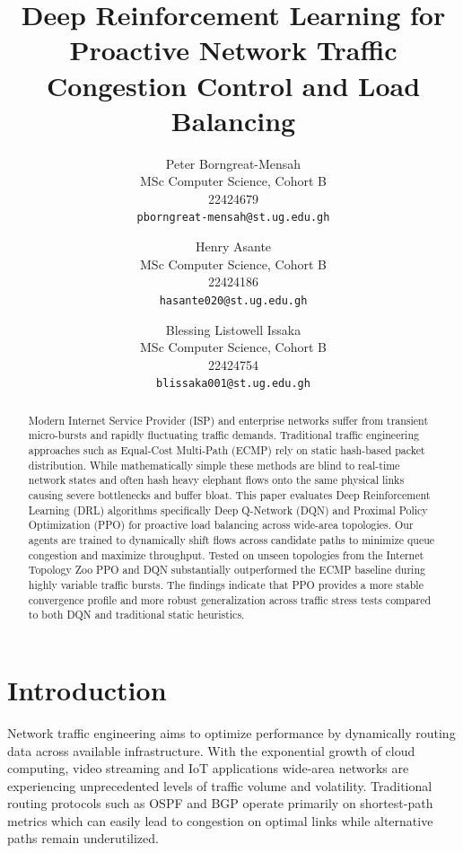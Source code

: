 \documentclass[10pt,twocolumn,letterpaper]{article}
\begin{document}
\title{Deep Reinforcement Learning for Proactive Network Traffic Congestion Control and Load Balancing}

\author{
\small Peter Borngreat-Mensah\\
\small MSc Computer Science, Cohort B\\
\small 22424679\\
\small {\tt\scriptsize pborngreat-mensah@st.ug.edu.gh}
\and
\small Henry Asante\\
\small MSc Computer Science, Cohort B\\
\small 22424186\\
\small {\tt\scriptsize hasante020@st.ug.edu.gh}
\and
\small Blessing Listowell Issaka\\
\small MSc Computer Science, Cohort B\\
\small 22424754\\
\small {\tt\scriptsize blissaka001@st.ug.edu.gh}
}

\maketitle

\begin{abstract}
Modern Internet Service Provider (ISP) and enterprise networks suffer from transient micro-bursts and rapidly fluctuating traffic demands. Traditional traffic engineering approaches such as Equal-Cost Multi-Path (ECMP) rely on static hash-based packet distribution. While mathematically simple these methods are blind to real-time network states and often hash heavy elephant flows onto the same physical links causing severe bottlenecks and buffer bloat. This paper evaluates Deep Reinforcement Learning (DRL) algorithms specifically Deep Q-Network (DQN) and Proximal Policy Optimization (PPO) for proactive load balancing across wide-area topologies. Our agents are trained to dynamically shift flows across candidate paths to minimize queue congestion and maximize throughput. Tested on unseen topologies from the Internet Topology Zoo PPO and DQN substantially outperformed the ECMP baseline during highly variable traffic bursts. The findings indicate that PPO provides a more stable convergence profile and more robust generalization across traffic stress tests compared to both DQN and traditional static heuristics.
\end{abstract}

\section{Introduction}
Network traffic engineering aims to optimize performance by dynamically routing data across available infrastructure. With the exponential growth of cloud computing, video streaming and IoT applications wide-area networks are experiencing unprecedented levels of traffic volume and volatility. Traditional routing protocols such as OSPF and BGP operate primarily on shortest-path metrics which can easily lead to congestion on optimal links while alternative paths remain underutilized.
\end{document}
